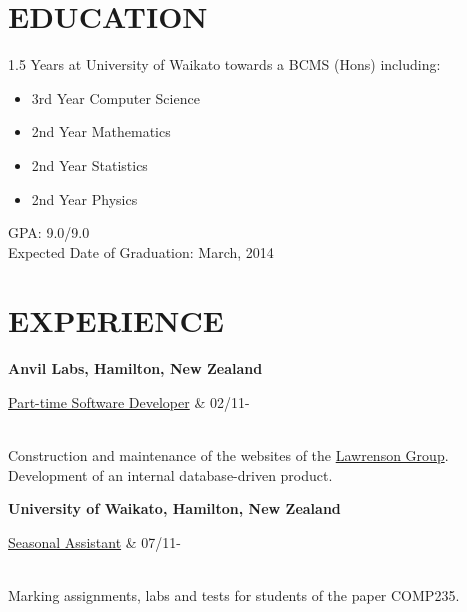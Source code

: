 \documentclass[margin,11pt]{res} %
\begin{document}

\address{{\bf Address} \\ 7 Sutton Crescent  \\ Hamilton 3216\\
        (027) 739-3946 \\ bpnzltd@gmail.com}
\address{}

\begin{resume}

\section{EDUCATION}
				1.5 Years at University of Waikato
				towards a BCMS (Hons) including:
	                \begin{itemize} %
                    \item[] 3rd Year Computer Science
                    \item[] 2nd Year Mathematics
                    \item[] 2nd Year Statistics
                    \item[] 2nd Year Physics
                    \end{itemize}
                GPA: 9.0/9.0 \\
                Expected Date of Graduation: March, 2014


\section{EXPERIENCE}      {\bf Anvil Labs, Hamilton, New Zealand} \\
                \begin{ncolumn}{2} %
                \underline{Part-time Software Developer}     &      02/11-
                \end{ncolumn} \\
                Construction and maintenance of the websites of the
                \href{http://lawrensongroup.co.nz}{Lawrenson Group}.
                Development of an internal database-driven product.

                {\bf University of Waikato, Hamilton, New Zealand} \\
                \begin{ncolumn}{2} %
                \underline{Seasonal Assistant} &   07/11-
                \end{ncolumn} \\
                Marking assignments, labs and tests for students of the
                paper COMP235.


\end{resume}
\end{document}
